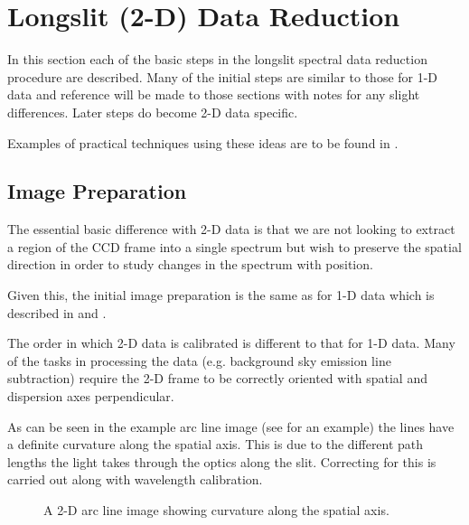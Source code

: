 \section{Longslit (2-D) Data Reduction}

In this section each of the basic steps in the longslit spectral data reduction
procedure are described. Many of the initial steps are similar to those 
for 1-D data and reference will be made to those sections with notes
for any slight differences. Later steps do become 2-D data specific.

Examples of practical techniques using these ideas are to be found
in \scspec{\S\ref{longslit_worked_example}}
{}.


\subsection{Image Preparation}

The essential basic difference with 2-D data is that we are not
looking to extract a region of the CCD frame into a single spectrum
but wish to preserve the spatial direction in order to study changes
in the spectrum with position.

Given this, the initial image preparation is the same as for 1-D data
which is described in \scspec{\S\ref{image_preparation}}
{} and 
 \scspec{\S\ref{flat_fielding}}
{}.



The order in which 2-D data is calibrated is different to that for 1-D 
data. Many of the tasks in processing the data (e.g. background sky
emission line subtraction) require the 2-D frame to be correctly
oriented with spatial and dispersion axes perpendicular.

As can be seen in the example arc line image (see  for an example) the lines have a definite 
curvature along the spatial axis. This is due to the different path
lengths the light takes through the optics along the slit. Correcting
for this is carried out along with wavelength calibration.

\begin{figure}
\begin{center}
{\leavevmode\epsfysize=136mm}

\parbox{140mm}{
\caption{A 2-D arc line image showing curvature along the spatial axis.}
\label{arc_line_curve}
}
\end{center}
\end{figure}




